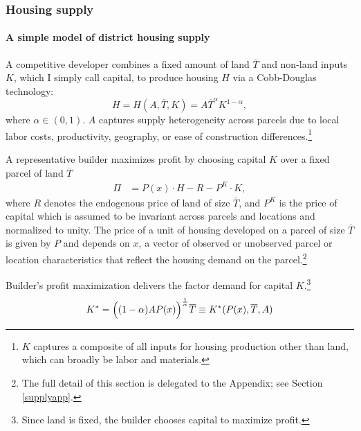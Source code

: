 \documentclass[
  12pt,
]{article}
\begin{document}
\subsubsection{Housing supply}\label{housing-supply}

\paragraph*{A simple model of district housing supply}\label{a-simple-model-of-district-housing-supply}

A competitive developer combines a fixed amount of land \(\overline{T}\) and non-land inputs \(K\), which I simply call capital, to produce housing \(H\) via a Cobb-Douglas technology:\begin{equation}
    H = H(A, \overline{T}, K) = A \overline{T}^{\alpha} K^{1-\alpha}
    \label{eq:cobb},
\end{equation} where \(\alpha \in (0, 1)\). \(A\) captures supply heterogeneity across parcels due to local labor costs, productivity, geography, or ease of construction differences.\footnote{\(K\) captures a composite of all inputs for housing production other than land, which can broadly be labor and materials.}

A representative builder maximizes profit by choosing capital \(K\) over a fixed parcel of land \(\overline{T}\) \[\begin{aligned}
\Pi &= P(x) \cdot H - R - P^K\cdot K,
\end{aligned}\]where \(R\) denotes the endogenous price of land of size \(\overline{T}\), and \(P^K\) is the price of capital which is assumed to be invariant across parcels and locations and normalized to unity. The price of a unit of housing developed on a parcel of size \(\overline{T}\) is given by \(P\) and depends on \(x\), a vector of observed or unobserved parcel or location characteristics that reflect the housing demand on the parcel.\footnote{The full detail of this section is delegated to the Appendix; see Section \ref{supplyapp}.}

Builder's profit maximization delivers the factor demand for capital \(K\).\footnote{Since land is fixed, the builder chooses capital to maximize profit.} \[\begin{aligned}
 K^* = \Bigl((1-\alpha)AP(x)\Bigr)^{\frac{1}{\alpha}}\overline{T}\equiv K^*(P(x), \overline{T}, A) \end{aligned}\]
\end{document}

